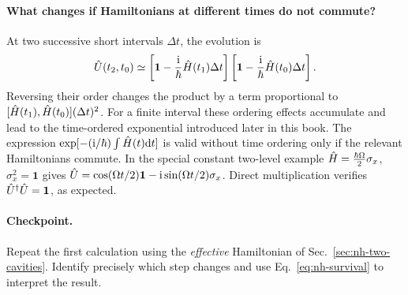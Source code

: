 \paragraph{What changes if Hamiltonians at different times do not commute?}
At two successive short intervals $\Delta t$, the evolution is
\begin{equation}
\hat{U}(t_2,t_0)\simeq
\left[\mathbf1-\frac{\mathrm{i}}{\hbar}\hat{H}(t_1)\Delta t\right]
\left[\mathbf1-\frac{\mathrm{i}}{\hbar}\hat{H}(t_0)\Delta t\right].
\end{equation}
Reversing their order changes the product by a term
proportional to
$[\hat{H}(t_1),\hat{H}(t_0)](\Delta t)^2$.
For a finite interval these ordering effects accumulate and
lead to the time-ordered exponential introduced later in this book.
The expression
$\exp[-(\mathrm{i}/\hbar)\int\hat{H}(t)\mathrm{d} t]$
is valid without time ordering only if the relevant Hamiltonians
commute. In the special constant two-level example
$\hat{H}=\tfrac{\hbar\Omega}{2}\sigma_x$,
$\sigma_x^2=\mathbf1$ gives
$\hat{U}=\cos(\Omega t/2)\mathbf1-\mathrm{i}\sin(\Omega t/2)\sigma_x$.
Direct multiplication verifies
$\hat{U}^\dagger\hat{U}=\mathbf1$, as expected.

\paragraph{Checkpoint.}
Repeat the first calculation using the \emph{effective} Hamiltonian
of Sec.~\ref{sec:nh-two-cavities}. Identify precisely which step
changes and use Eq.~\eqref{eq:nh-survival} to interpret the result.
